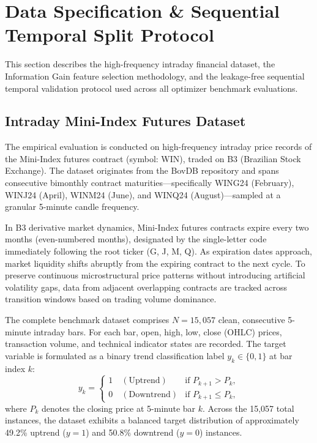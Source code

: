 
\section{Data Specification \& Sequential Temporal Split Protocol}\label{sec:data}

This section describes the high-frequency intraday financial dataset, the Information Gain feature selection methodology, and the leakage-free sequential temporal validation protocol used across all optimizer benchmark evaluations.

\subsection{Intraday Mini-Index Futures Dataset}\label{sec:data_dataset}

The empirical evaluation is conducted on high-frequency intraday price records of the Mini-Index futures contract (symbol: WIN), traded on B3 (Brazilian Stock Exchange). The dataset originates from the BovDB repository \cite{cardoso2022bovdb, souza2024dataset} and spans consecutive bimonthly contract maturities—specifically WING24 (February), WINJ24 (April), WINM24 (June), and WINQ24 (August)—sampled at a granular 5-minute candle frequency.

In B3 derivative market dynamics, Mini-Index futures contracts expire every two months (even-numbered months), designated by the single-letter code immediately following the root ticker (G, J, M, Q). As expiration dates approach, market liquidity shifts abruptly from the expiring contract to the next cycle. To preserve continuous microstructural price patterns without introducing artificial volatility gaps, data from adjacent overlapping contracts are tracked across transition windows based on trading volume dominance.

The complete benchmark dataset comprises $N = 15,057$ clean, consecutive 5-minute intraday bars. For each bar, open, high, low, close (OHLC) prices, transaction volume, and technical indicator states are recorded. The target variable is formulated as a binary trend classification label $y_k \in \{0, 1\}$ at bar index $k$:
\begin{equation}\label{eq:target}
    y_k = \begin{cases} 1 \quad (\text{Uptrend}) & \text{if } P_{k+1} > P_k, \\ 0 \quad (\text{Downtrend}) & \text{if } P_{k+1} \le P_k, \end{cases}
\end{equation}
where $P_k$ denotes the closing price at 5-minute bar $k$. Across the 15,057 total instances, the dataset exhibits a balanced target distribution of approximately 49.2\% uptrend ($y=1$) and 50.8\% downtrend ($y=0$) instances.

